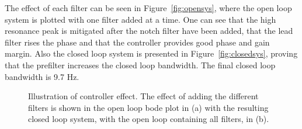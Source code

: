 The effect of each filter can be seen in Figure~\ref{fig:opensys}, where the open loop system is plotted with one filter added at a time. One can see that the high resonance peak is mitigated after the notch filter have been added, that the lead filter rises the phase and that the \abbrPID controller provides good phase and gain margin. Also the closed loop system is presented in Figure~\ref{fig:closedsys}, proving that the prefilter increases the closed loop bandwidth. The final closed loop bandwidth is 9.7 Hz.

\begin{figure}[h!]
  \centering %
  \qquad
  \caption{\label{fig:open_and_closed_sys} Illustration of controller effect. The effect of adding the different filters is shown in the open loop bode plot in (a) with the resulting closed loop system, with the open loop containing all filters, in (b). }
\end{figure}
